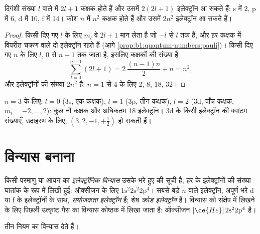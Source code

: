 \begin{proposition}[उपकोश और कोश की धारिता]\label{prop:b1:quantum-numbers:capacity}
दिगंशी संख्या $l$ वाले  में $2l + 1$ कक्षक होते हैं और उसमें
$2(2l + 1)$ इलेक्ट्रॉन आ सकते हैं: s में 2, p में 6, d में 10, f में 14। कोश $n$
में $n^2$ कक्षक होते हैं और उसमें $2n^2$ इलेक्ट्रॉन आ सकते हैं।
\end{proposition}

\begin{proof}
किसी दिए गए $l$ के लिए $m_l$ वे $2l + 1$ मान लेता है जो $-l$ से $l$ तक हैं, और
हर कक्षक में विपरीत चक्रण वाले दो इलेक्ट्रॉन रहते हैं (आगे \cref{prop:b1:quantum-numbers:pauli})।
किसी दिए गए $n$ के लिए $l$, $0$ से $n - 1$ तक जाता है, इसलिए
कक्षकों की संख्या है
\[
  \sum_{l=0}^{n-1} (2l+1) = 2\,\frac{(n-1)n}{2} + n = n^2 ,
\]
और इलेक्ट्रॉनों की संख्या $2n^2$ है: $n = 1$ से 4 के लिए 2, 8, 18, 32।
\end{proof}

\begin{example}[तीसरा कोश]\label{ex:b1:quantum-numbers:third}
$n = 3$ के लिए: $l = 0$ (3s, एक कक्षक), $l = 1$ (3p, तीन कक्षक),
$l = 2$ (3d, पाँच कक्षक, $m_l = -2, \dots, 2$): कुल नौ कक्षक और अधिकतम
18 इलेक्ट्रॉन। 3d के किसी इलेक्ट्रॉन की क्वांटम संख्याएँ, उदाहरण के लिए,
$(3, 2, -1, +\tfrac12)$ हो सकती हैं।
\end{example}

\section{विन्यास बनाना}

\begin{definition}[इलेक्ट्रॉनिक विन्यास]\label{def:b1:quantum-numbers:configuration}
किसी परमाणु या आयन का \emph{इलेक्ट्रॉनिक विन्यास}
उसके भरे हुए  की सूची है, हर  के इलेक्ट्रॉनों की संख्या घातांक के रूप में
लिखी हुई: ऑक्सीजन के लिए $1\text{s}^2 2\text{s}^2
2\text{p}^4$। सबसे बड़े $n$ वाले इलेक्ट्रॉन, अपूर्ण भरे d या f  के
इलेक्ट्रॉनों के साथ, \emph{संयोजकता
इलेक्ट्रॉन} हैं; शेष \emph{क्रोड
इलेक्ट्रॉन} हैं। विन्यास को संक्षेप में लिखने के लिए
पिछली उत्कृष्ट गैस का विन्यास कोष्ठक में लिखा जाता है:
ऑक्सीजन $[\ce{He}]\,2\text{s}^2 2\text{p}^4$ है।
\end{definition}

तीन नियम  का विन्यास देते हैं।

